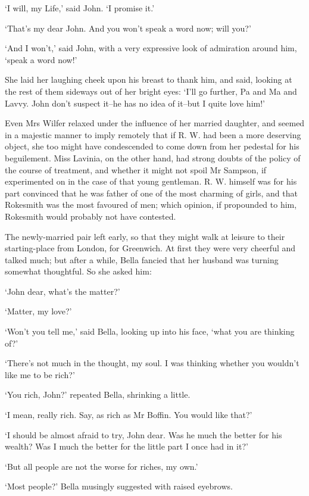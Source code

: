 ‘I will, my Life,’ said John. ‘I promise it.’

‘That’s my dear John. And you won’t speak a word now; will you?’

‘And I won’t,’ said John, with a very expressive look of admiration
around him, ‘speak a word now!’

She laid her laughing cheek upon his breast to thank him, and said,
looking at the rest of them sideways out of her bright eyes: ‘I’ll go
further, Pa and Ma and Lavvy. John don’t suspect it--he has no idea of
it--but I quite love him!’

Even Mrs Wilfer relaxed under the influence of her married daughter, and
seemed in a majestic manner to imply remotely that if R. W. had been a
more deserving object, she too might have condescended to come down from
her pedestal for his beguilement. Miss Lavinia, on the other hand, had
strong doubts of the policy of the course of treatment, and whether it
might not spoil Mr Sampson, if experimented on in the case of that young
gentleman. R. W. himself was for his part convinced that he was father
of one of the most charming of girls, and that Rokesmith was the most
favoured of men; which opinion, if propounded to him, Rokesmith would
probably not have contested.

The newly-married pair left early, so that they might walk at leisure to
their starting-place from London, for Greenwich. At first they were
very cheerful and talked much; but after a while, Bella fancied that her
husband was turning somewhat thoughtful. So she asked him:

‘John dear, what’s the matter?’

‘Matter, my love?’

‘Won’t you tell me,’ said Bella, looking up into his face, ‘what you are
thinking of?’

‘There’s not much in the thought, my soul. I was thinking whether you
wouldn’t like me to be rich?’

‘You rich, John?’ repeated Bella, shrinking a little.

‘I mean, really rich. Say, as rich as Mr Boffin. You would like that?’

‘I should be almost afraid to try, John dear. Was he much the better for
his wealth? Was I much the better for the little part I once had in it?’

‘But all people are not the worse for riches, my own.’

‘Most people?’ Bella musingly suggested with raised eyebrows.

